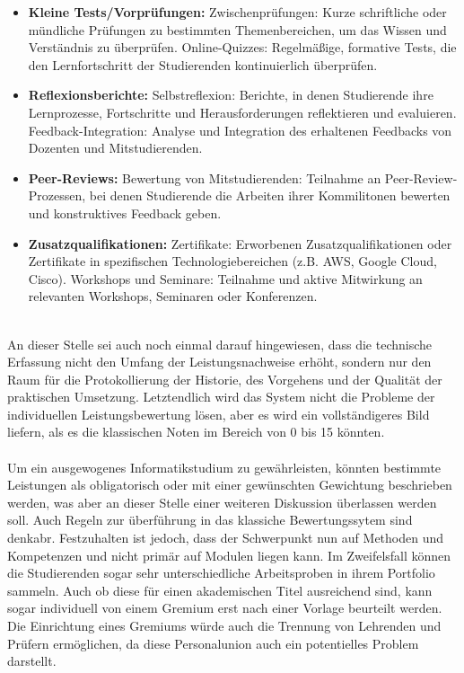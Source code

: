 \documentclass[conference]{IEEEtran}
\begin{document}
\begin{itemize}[leftmargin=*]
    \item \textbf{Kleine Tests/Vorprüfungen:}
    \newline Zwischenprüfungen: Kurze schriftliche oder mündliche Prüfungen zu bestimmten Themenbereichen, um das Wissen und Verständnis zu überprüfen.
    \newline Online-Quizzes: Regelmäßige, formative Tests, die den Lernfortschritt der Studierenden kontinuierlich überprüfen.

    \item \textbf{Reflexionsberichte:}
    \newline Selbstreflexion: Berichte, in denen Studierende ihre Lernprozesse, Fortschritte und Herausforderungen reflektieren und evaluieren.
    \newline Feedback-Integration: Analyse und Integration des erhaltenen Feedbacks von Dozenten und Mitstudierenden.

    \item \textbf{Peer-Reviews:}
    \newline Bewertung von Mitstudierenden: Teilnahme an Peer-Review-Prozessen, bei denen Studierende die Arbeiten ihrer Kommilitonen bewerten und konstruktives Feedback geben.

    \item \textbf{Zusatzqualifikationen:}
    \newline Zertifikate: Erworbenen Zusatzqualifikationen oder Zertifikate in spezifischen Technologiebereichen (z.B. AWS, Google Cloud, Cisco).
    \newline Workshops und Seminare: Teilnahme und aktive Mitwirkung an relevanten Workshops, Seminaren oder Konferenzen.
\end{itemize}
\mbox{}\\
An dieser Stelle sei auch noch einmal darauf hingewiesen, dass die technische Erfassung nicht den Umfang der Leistungsnachweise erhöht, sondern nur den Raum für die Protokollierung der Historie, des Vorgehens und der Qualität der praktischen Umsetzung.
Letztendlich wird das System nicht die Probleme der individuellen Leistungsbewertung lösen, aber es wird ein vollständigeres Bild liefern, als es die klassischen Noten im Bereich von 0 bis 15 könnten.
\\\\
Um ein ausgewogenes Informatikstudium zu gewährleisten, könnten bestimmte Leistungen als obligatorisch oder mit einer gewünschten Gewichtung beschrieben werden, was aber an dieser Stelle einer weiteren Diskussion überlassen werden soll. Auch Regeln zur überführung in das klassiche Bewertungssytem sind denkabr. Festzuhalten ist jedoch, dass der Schwerpunkt nun auf Methoden und Kompetenzen und nicht primär auf Modulen liegen kann. Im Zweifelsfall können die Studierenden sogar sehr unterschiedliche Arbeitsproben in ihrem Portfolio sammeln. Auch ob diese für einen akademischen Titel ausreichend sind, kann sogar individuell von einem Gremium erst nach einer Vorlage beurteilt werden. Die Einrichtung eines Gremiums würde auch die Trennung von Lehrenden und Prüfern ermöglichen, da diese Personalunion auch ein potentielles Problem darstellt.
\end{document}
